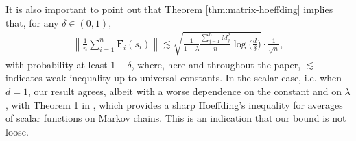 It is also important to point out that Theorem \ref{thm:matrix-hoeffding} implies that, for any $\delta \in (0,1)$, 
\begin{align}
\label{eq:thm-matrix-hoeffding-whp}
\left\|\frac{1}{n}\sum_{i=1}^n \bm{F}_i(s_i)\right\|  \lesssim \sqrt{\frac{1}{1-\lambda} \frac{\sum_{j=1}^n M_j^2}{n} \log \Big(\frac{d}{\delta}\Big)} \cdot \frac{1}{\sqrt{n}},
\end{align} 
with probability at least $1-\delta$, where, here and throughout the paper, $\lesssim $ indicates weak inequality up to universal constants.
In the scalar case, i.e. when $d=1$, our result agrees, albeit with a worse dependence on the constant and on $\lambda$, with Theorem 1 in \cite{Fan2021Hoeffding}, which provides a sharp Hoeffding's inequality for averages of scalar functions on Markov chains. This is an indication that our bound is not loose. 





